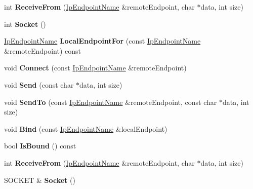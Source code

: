 \begin{DoxyCompactItemize}
\mbox{\label{class_udp_socket_1_1_implementation_a894288489dc6056ad12dd392f4982177}} 
int {\bfseries Receive\+From} (\hyperlink{class_ip_endpoint_name}{Ip\+Endpoint\+Name} \&remote\+Endpoint, char $\ast$data, int size)
\item 
\mbox{\label{class_udp_socket_1_1_implementation_abba52e5ee26464be9b4f9bd2776c8847}} 
int {\bfseries Socket} ()
\item 
\mbox{\label{class_udp_socket_1_1_implementation_a9338e0eec61c75570d9d731ed8e327b4}} 
\hyperlink{class_ip_endpoint_name}{Ip\+Endpoint\+Name} {\bfseries Local\+Endpoint\+For} (const \hyperlink{class_ip_endpoint_name}{Ip\+Endpoint\+Name} \&remote\+Endpoint) const
\item 
\mbox{\label{class_udp_socket_1_1_implementation_ae7e04b79286647f041e0c47bb1341224}} 
void {\bfseries Connect} (const \hyperlink{class_ip_endpoint_name}{Ip\+Endpoint\+Name} \&remote\+Endpoint)
\item 
\mbox{\label{class_udp_socket_1_1_implementation_ae81d7b81eea4debb516aaefcf59552a5}} 
void {\bfseries Send} (const char $\ast$data, int size)
\item 
\mbox{\label{class_udp_socket_1_1_implementation_aa3dca61e71efa21ba3d0257f8298ade0}} 
void {\bfseries Send\+To} (const \hyperlink{class_ip_endpoint_name}{Ip\+Endpoint\+Name} \&remote\+Endpoint, const char $\ast$data, int size)
\item 
\mbox{\label{class_udp_socket_1_1_implementation_adda677bc8f9feff5787a6cd7374ec945}} 
void {\bfseries Bind} (const \hyperlink{class_ip_endpoint_name}{Ip\+Endpoint\+Name} \&local\+Endpoint)
\item 
\mbox{\label{class_udp_socket_1_1_implementation_a9fa704289dbe67ca2ca035a524b2ea35}} 
bool {\bfseries Is\+Bound} () const
\item 
\mbox{\label{class_udp_socket_1_1_implementation_a894288489dc6056ad12dd392f4982177}} 
int {\bfseries Receive\+From} (\hyperlink{class_ip_endpoint_name}{Ip\+Endpoint\+Name} \&remote\+Endpoint, char $\ast$data, int size)
\item 
\mbox{\label{class_udp_socket_1_1_implementation_ab217238e981c760a424bbea23a924d91}} 
S\+O\+C\+K\+ET \& {\bfseries Socket} ()
\end{DoxyCompactItemize}



